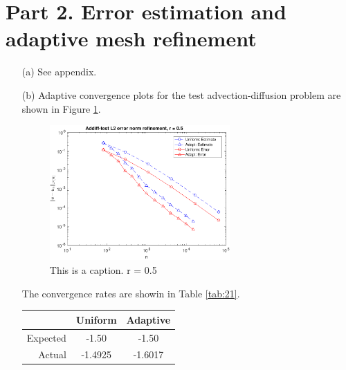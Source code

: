 \documentclass{article}
\begin{document}
\section*{Part 2. Error estimation and adaptive mesh refinement}
\begin{itemize}
	\item[(a)] See appendix.
	
	\item[(b)] Adaptive convergence plots for the test advection-diffusion problem are shown in Figure \ref{fig:21}.
	\begin{figure}[H]
		\centering
		\includegraphics[width=0.65\textwidth]{addiff-test_adapt.pdf}
		\caption{This is a caption. r = 0.5}
		\label{fig:21}
	\end{figure}
	The convergence rates are showin in Table \ref{tab:21}.
	\begin{table}[H]
		\centering
		\begin{tabular}{r||c|c}
			& Uniform & Adaptive \\
			\hline
			Expected & -1.50 & -1.50 \\
			\hline
			Actual & -1.4925 & -1.6017 \\
			

\end{tabular}
\end{table}
\end{itemize}
\end{document}

